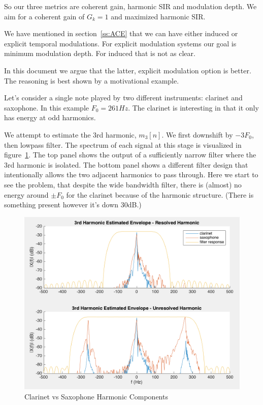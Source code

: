 \documentclass [11pt, proquest,oneside] {ganter_thesis}[2015/03/03]
\begin{document}
So our three metrics are coherent gain, harmonic SIR and modulation depth.  We aim for a coherent gain of $G_k = 1$ and maximized harmonic SIR.

We have mentioned in section~\ref{ss:ACE} that we can have either induced or explicit temporal modulations.  For explicit modulation systems our goal is minimum modulation depth.  For induced that is not as clear.

In this document we argue that the latter, explicit modulation option is better.  The reasoning is best shown by a motivational example.

Let's consider a single note played by two different instruments: clarinet and saxophone.  In this example $F_0 = 261Hz$.  The clarinet is interesting in that it only has energy at odd harmonics.

We attempt to estimate the 3rd harmonic, $m_3[n]$.  We first downshift by $-3F_0$, then lowpass filter.  The spectrum of each signal at this stage is visualized in figure~\ref{fig:clarinetVSsax_F}.  The top panel shows the output of a sufficiently narrow filter where the 3rd harmonic is isolated.  The bottom panel shows a different filter design that intentionally allows the two adjacent harmonics to pass through.  Here we start to see the problem, that despite the wide bandwidth filter, there is (almost) no energy around $\pm F_0$ for the clarinet because of the harmonic structure.  (There is something present however it's down 30dB.)

\begin{figure}[!ht]
  \centering
    \includegraphics[width=1\textwidth]{clarinetVSsax_F}
    \caption{Clarinet vs Saxophone Harmonic Components}\label{fig:clarinetVSsax_F}
\end{figure}
\end{document}
